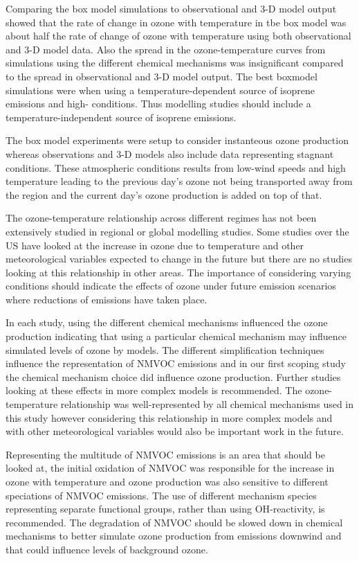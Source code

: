 Comparing the box model simulations to observational and 3-D model output showed that the rate of change in ozone with temperature in tbe box model was about half the rate of change of ozone with temperature using both observational and 3-D model data.
Also the spread in the ozone-temperature curves from simulations using the different chemical mechanisms was insignificant compared to the spread in observational and 3-D model output.
The best boxmodel simulations were when using a temperature-dependent source of isoprene emissions and high- conditions.
Thus modelling studies should include a temperature-independent source of isoprene emissions.

The box model experiments were setup to consider instanteous ozone production whereas observations and 3-D models also include data representing stagnant conditions.
These atmospheric conditions results from low-wind speeds and high temperature leading to the previous day's ozone not being transported away from the region and the current day's ozone production is added on top of that.

The ozone-temperature relationship across different  regimes has not been extensively studied in regional or global modelling studies.
Some studies over the US have looked at the increase in ozone due to temperature and other meteorological variables expected to change in the future but there are no studies looking at this relationship in other areas.
The importance of considering varying  conditions should indicate the effects of ozone under future emission scenarios where reductions of  emissions have taken place.

In each study, using the different chemical mechanisms influenced the ozone production indicating that using a particular chemical mechanism may influence simulated levels of ozone by models.
The different simplification techniques influence the representation of NMVOC emissions and in our first scoping study the chemical mechanism choice did influence ozone production.
Further studies looking at these effects in more complex models is recommended.
The ozone-temperature relationship was well-represented by all chemical mechanisms used in this study however considering this relationship in more complex models and with other meteorological variables would also be important work in the future.

Representing the multitude of NMVOC emissions is an area that should be looked at, the initial oxidation of NMVOC was responsible for the increase in ozone with temperature and ozone production was also sensitive to different speciations of NMVOC emissions.
The use of different mechanism species representing separate functional groups, rather than using OH-reactivity, is recommended.
The degradation of NMVOC should be slowed down in chemical mechanisms to better simulate ozone production from emissions downwind and that could influence levels of background ozone.
